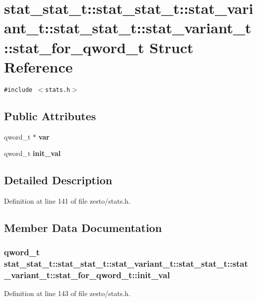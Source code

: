 \section{stat\_\-stat\_\-t::stat\_\-stat\_\-t::stat\_\-variant\_\-t::stat\_\-stat\_\-t::stat\_\-variant\_\-t::stat\_\-for\_\-qword\_\-t Struct Reference}
\label{structstat__stat__t_1_1stat__variant__t_1_1stat__for__qword__t}
{\tt \#include $<$stats.h$>$}

\subsection*{Public Attributes}
\begin{CompactItemize}
\item 
qword\_\-t $\ast$ {\bf var}
\item 
qword\_\-t {\bf init\_\-val}
\end{CompactItemize}


\subsection{Detailed Description}


Definition at line 141 of file zesto/stats.h.

\subsection{Member Data Documentation}
\subsubsection[{init\_\-val}]{\setlength{\rightskip}{0pt plus 5cm}qword\_\-t stat\_\-stat\_\-t::stat\_\-stat\_\-t::stat\_\-variant\_\-t::stat\_\-stat\_\-t::stat\_\-variant\_\-t::stat\_\-for\_\-qword\_\-t::init\_\-val}\label{structstat__stat__t_1_1stat__variant__t_1_1stat__for__qword__t_2b9cfcbe9842490e03b527ba86c0f243}




Definition at line 143 of file zesto/stats.h.
